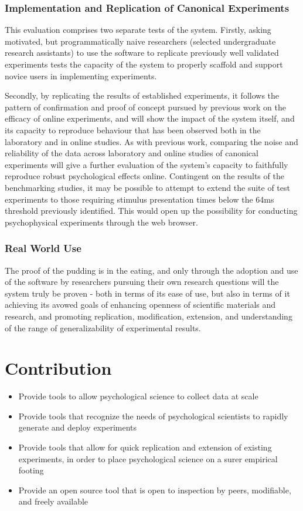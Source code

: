\documentclass[12pt,a4paper,titlepage]{scrreprt}
\begin{document}
\subsection{Implementation and Replication of Canonical Experiments}
This evaluation comprises two separate tests of the system. Firstly, asking motivated, but programmatically naive researchers (selected undergraduate research assistants) to use the software to replicate previously well validated experiments tests the capacity of the system to properly scaffold and support novice users in implementing experiments.

Secondly, by replicating the results of established experiments, it follows the pattern of confirmation and proof of concept pursued by previous work on the efficacy of online experiments\cite{germine_is_2012,crump_evaluating_2013}, and will show the impact of the system itself, and its capacity to reproduce behaviour that has been observed  both in the laboratory and in online studies. As with previous work, comparing the noise and reliability of the data across laboratory and online studies of canonical experiments will give a further evaluation of the system's capacity to faithfully reproduce robust psychological effects online.
Contingent on the results of the benchmarking studies, it may be possible to attempt to extend the suite of test experiments to those requiring stimulus presentation times below the 64ms threshold previously identified\cite{crump_evaluating_2013}. This would open up the possibility for conducting psychophysical experiments through the web browser.
\subsection{Real World Use}
The proof of the pudding is in the eating, and only through the adoption and use of the software by researchers pursuing their own research questions will the system truly be proven - both in terms of its ease of use, but also in terms of it achieving its avowed goals of enhancing openness of scientific materials and research, and promoting replication, modification, extension, and understanding of the range of generalizability of experimental results.
\chapter{Contribution}
\begin{itemize}
\item Provide tools to allow psychological science to collect data at scale
\item Provide tools that recognize the needs of psychological scientists to rapidly generate and deploy experiments
\item Provide tools that allow for quick replication and extension of existing experiments, in order to place psychological science on a surer empirical footing
\item Provide an open source tool that is open to inspection by peers, modifiable, and freely available
\end{itemize}
      
    
    {}
\end{document}
